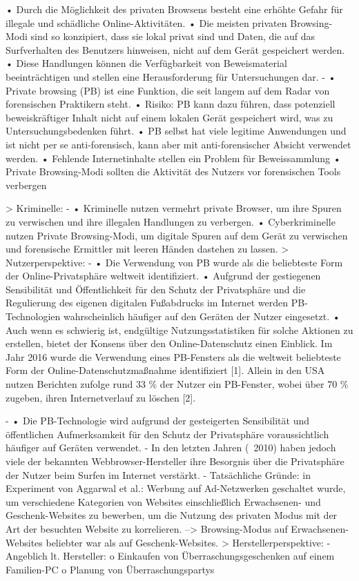 			•	Durch die Möglichkeit des privaten Browsens besteht eine erhöhte Gefahr für illegale und schädliche Online-Aktivitäten.
			•	Die meisten privaten Browsing-Modi sind so konzipiert, dass sie lokal privat sind und Daten, die auf das Surfverhalten des Benutzers hinweisen, nicht auf dem Gerät gespeichert werden.
			•	Diese Handlungen können die Verfügbarkeit von Beweismaterial beeinträchtigen und stellen eine Herausforderung für Untersuchungen dar.
		- \cite{Horsman.2019} 
			• Private browsing (PB) ist eine Funktion, die seit langem auf dem Radar von forensischen Praktikern steht.
			• Risiko: PB kann dazu führen, dass potenziell beweiskräftiger Inhalt nicht auf einem lokalen Gerät gespeichert wird, was zu Untersuchungsbedenken führt.
			•	  PB selbst hat viele legitime Anwendungen und ist nicht per se anti-forensisch, kann aber mit anti-forensischer Absicht verwendet werden.
			•	Fehlende Internetinhalte stellen ein Problem für Beweissammlung
			•	Private Browsing-Modi sollten die Aktivität des Nutzers vor forensischen Tools verbergen 
		
	
	> Kriminelle: 
		- \cite{Mahlous.2020}
			•	Kriminelle nutzen vermehrt private Browser, um ihre Spuren zu verwischen und ihre illegalen Handlungen zu verbergen.
			•	Cyberkriminelle nutzen Private Browsing-Modi, um digitale Spuren auf dem Gerät zu verwischen und forensische Ermittler mit leeren Händen dastehen zu lassen.	
	> Nutzerperspektive:
		- \cite{Horsman.2019}
			•	Die Verwendung von PB wurde als die beliebteste Form der Online-Privatsphäre weltweit identifiziert.
			•	Aufgrund der gestiegenen Sensibilität und Öffentlichkeit für den Schutz der Privatsphäre und die Regulierung des eigenen digitalen Fußabdrucks im Internet werden PB-Technologien wahrscheinlich häufiger auf den Geräten der Nutzer eingesetzt. 
			•	Auch wenn es schwierig ist, endgültige Nutzungsstatistiken für solche Aktionen zu erstellen, bietet der Konsens über den Online-Datenschutz einen Einblick. Im Jahr 2016 wurde die Verwendung eines PB-Fensters als die weltweit beliebteste Form der Online-Datenschutzmaßnahme identifiziert [1]. Allein in den USA nutzen Berichten zufolge rund 33 \% der Nutzer ein PB-Fenster, wobei über 70 \% zugeben, ihren Internetverlauf zu löschen [2].
			
		- \cite{Horsman.2019} •	Die PB-Technologie wird aufgrund der gesteigerten Sensibilität und öffentlichen Aufmerksamkeit für den Schutz der Privatsphäre voraussichtlich häufiger auf Geräten verwendet.
		- \cite{Said.2011} In den letzten Jahren (~2010) haben jedoch viele der bekannten Webbrowser-Hersteller ihre Besorgnis über die Privatsphäre der Nutzer beim Surfen im Internet verstärkt.
		- Tatsächliche Gründe: \cite{Montasari.2015} in \cite{Aggarwal.2010} Experiment von Aggarwal et al.: Werbung auf Ad-Netzwerken geschaltet wurde, um verschiedene Kategorien von Websites einschließlich Erwachsenen- und Geschenk-Websites zu bewerben, um die Nutzung des privaten Modus mit der Art der besuchten Website zu korrelieren.
			--> Browsing-Modus auf Erwachsenen-Websites beliebter war als auf Geschenk-Websites.
	> Herstellerperspektive:
		- \cite{Montasari.2015} Angeblich lt. Hersteller: 
			o	Einkaufen von Überraschungsgeschenken auf einem Familien-PC 
			o	Planung von Überraschungspartys 
				

